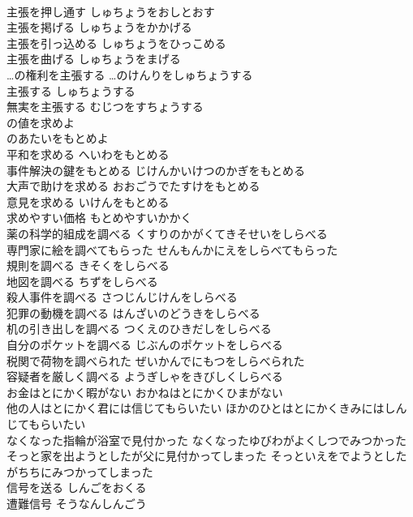 \documentclass[8pt]{extreport}
\begin{document}
\begin{CJK}{UTF8}{min}
\\	主張を押し通す	しゅちょうをおしとおす	
\\	主張を掲げる	しゅちょうをかかげる	
\\	主張を引っ込める	しゅちょうをひっこめる	
\\	主張を曲げる	しゅちょうをまげる	
\\	…の権利を主張する	…のけんりをしゅちょうする	
\\	主張する	しゅちょうする	
\\	無実を主張する	むじつをすちょうする	
\\	の値を求めよ	
\\	のあたいをもとめよ	
\\	平和を求める	へいわをもとめる	
\\	事件解決の鍵をもとめる	じけんかいけつのかぎをもとめる	
\\	大声で助けを求める	おおごうでたすけをもとめる	
\\	意見を求める	いけんをもとめる	
\\	求めやすい価格	もとめやすいかかく	
\\	薬の科学的組成を調べる	くすりのかがくてきそせいをしらべる	
\\	専門家に絵を調べてもらった	せんもんかにえをしらべてもらった	
\\	規則を調べる	きそくをしらべる	
\\	地図を調べる	ちずをしらべる	
\\	殺人事件を調べる	さつじんじけんをしらべる	
\\	犯罪の動機を調べる	はんざいのどうきをしらべる	
\\	机の引き出しを調べる	つくえのひきだしをしらべる	
\\	自分のポケットを調べる	じぶんのポケットをしらべる	
\\	税関で荷物を調べられた	ぜいかんでにもつをしらべられた	
\\	容疑者を厳しく調べる	ようぎしゃをきびしくしらべる	
\\	お金はとにかく暇がない	おかねはとにかくひまがない	
\\	他の人はとにかく君には信じてもらいたい	ほかのひとはとにかくきみにはしんじてもらいたい	
\\	なくなった指輪が浴室で見付かった	なくなったゆびわがよくしつでみつかった	
\\	そっと家を出ようとしたが父に見付かってしまった	そっといえをでようとしたがちちにみつかってしまった	
\\	信号を送る	しんごをおくる	
\\	遭難信号	そうなんしんごう	

\end{CJK}
\end{document}
